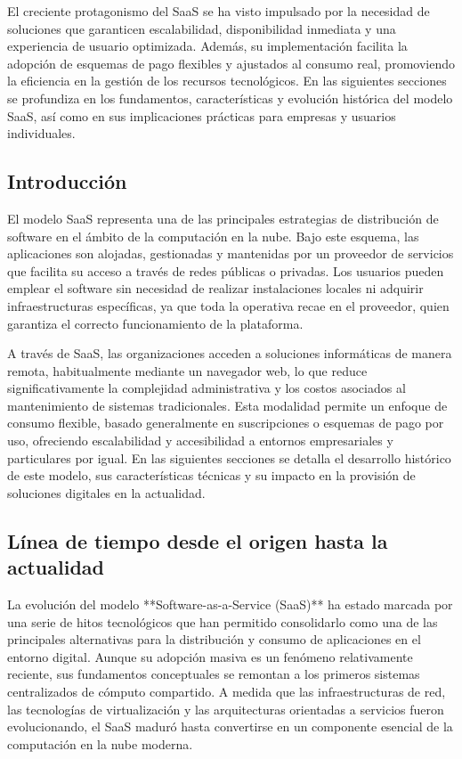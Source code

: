 {        El creciente protagonismo del SaaS se ha visto impulsado por la necesidad de soluciones que garanticen escalabilidad, disponibilidad inmediata y una experiencia de usuario optimizada. Además, su implementación facilita la adopción de esquemas de pago flexibles y ajustados al consumo real, promoviendo la eficiencia en la gestión de los recursos tecnológicos. En las siguientes secciones se profundiza en los fundamentos, características y evolución histórica del modelo SaaS, así como en sus implicaciones prácticas para empresas y usuarios individuales.

        \subsection{Introducción}
            El modelo SaaS representa una de las principales estrategias de distribución de software en el ámbito de la computación en la nube. Bajo este esquema, las aplicaciones son alojadas, gestionadas y mantenidas por un proveedor de servicios que facilita su acceso a través de redes públicas o privadas. Los usuarios pueden emplear el software sin necesidad de realizar instalaciones locales ni adquirir infraestructuras específicas, ya que toda la operativa recae en el proveedor, quien garantiza el correcto funcionamiento de la plataforma.

            A través de SaaS, las organizaciones acceden a soluciones informáticas de manera remota, habitualmente mediante un navegador web, lo que reduce significativamente la complejidad administrativa y los costos asociados al mantenimiento de sistemas tradicionales. Esta modalidad permite un enfoque de consumo flexible, basado generalmente en suscripciones o esquemas de pago por uso, ofreciendo escalabilidad y accesibilidad a entornos empresariales y particulares por igual. En las siguientes secciones se detalla el desarrollo histórico de este modelo, sus características técnicas y su impacto en la provisión de soluciones digitales en la actualidad.
            
        \subsection{Línea de tiempo desde el origen hasta la actualidad}
            La evolución del modelo **Software-as-a-Service (SaaS)** ha estado marcada por una serie de hitos tecnológicos que han permitido consolidarlo como una de las principales alternativas para la distribución y consumo de aplicaciones en el entorno digital. Aunque su adopción masiva es un fenómeno relativamente reciente, sus fundamentos conceptuales se remontan a los primeros sistemas centralizados de cómputo compartido. A medida que las infraestructuras de red, las tecnologías de virtualización y las arquitecturas orientadas a servicios fueron evolucionando, el SaaS maduró hasta convertirse en un componente esencial de la computación en la nube moderna.
                
}
